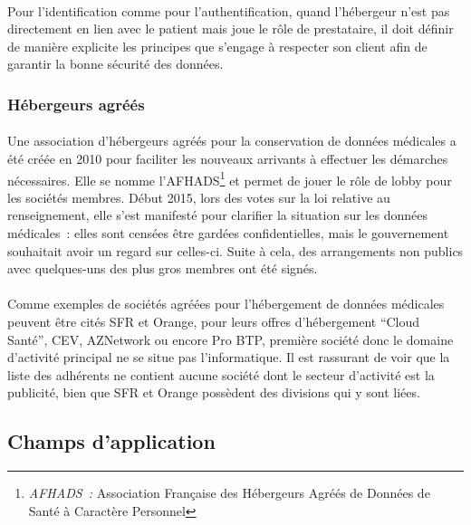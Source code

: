 \paragraph{}
Pour l'identification comme pour l'authentification, quand l'hébergeur n'est
pas directement en lien avec le patient mais joue le rôle de prestataire, il
doit définir de manière explicite les principes que s'engage à respecter son
client afin de garantir la bonne sécurité des données.


        \subsubsection{Hébergeurs agréés}

\paragraph{}
Une association d'hébergeurs agréés pour la conservation de données médicales a
été créée en 2010 pour faciliter les nouveaux arrivants à effectuer les
démarches nécessaires. Elle se nomme l'AFHADS\footnote{\emph{AFHADS~: }
Association Française des Hébergeurs Agréés de Données de Santé à Caractère
Personnel} et permet de jouer le rôle de lobby pour les sociétés membres. Début
2015, lors des votes sur la loi relative au renseignement, elle s'est manifesté
pour clarifier la situation sur les données médicales~: elles sont censées être
gardées confidentielles, mais le gouvernement souhaitait avoir un regard sur
celles-ci. Suite à cela, des arrangements non publics avec quelques-uns des
plus gros membres ont été signés.

\paragraph{}
Comme exemples de sociétés agréées pour l'hébergement de données médicales
peuvent être cités SFR et Orange, pour leurs offres d'hébergement ``Cloud
Santé'', CEV, AZNetwork ou encore Pro BTP, première société donc le domaine
d'activité principal ne se situe pas l'informatique. Il est rassurant de voir
que la liste des adhérents ne contient aucune société dont le secteur
d'activité est la publicité, bien que SFR et Orange possèdent des divisions qui
y sont liées.

        \subsection{Champs d'application}

